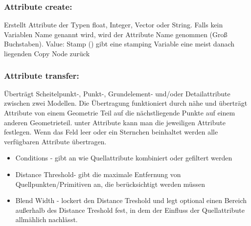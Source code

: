 \subsubsection*{​Attribute create:}
Erstellt Attribute der Typen float, Integer, Vector oder String. Falls kein Variablen Name genannt wird, wird der Attribute Name genommen (Groß Buchstaben).
Value: Stamp ()	gibt eine stamping Variable eine meist danach liegenden Copy Node zurück

\subsubsection*{​Attribute transfer:}
Überträgt Scheitelpunkt-, Punkt-, Grundelement- und/oder Detailattribute zwischen zwei Modellen.
Die Übertragung funktioniert durch nähe und überträgt Attribute von einem Geometrie Teil auf die nächstliegende Punkte auf einem anderen Geometrieteil. 
unter Attribute kann man die jeweiligen Attribute festlegen. Wenn das Feld leer oder ein Sternchen beinhaltet werden alle verfügbaren Attribute übertragen.
\begin{itemize}
\item Conditions - gibt an wie Quellattribute kombiniert oder gefiltert werden
\item Distance Threshold- gibt die maximale Entfernung von Quellpunkten/Primitiven an, die berücksichtigt werden müssen
\item Blend Width - lockert den Distance Treshold und legt optional einen Bereich außerhalb des Distance Treshold fest, in dem der Einfluss der Quellattribute allmählich nachlässt.
\end{itemize}


